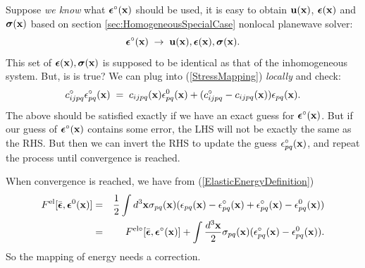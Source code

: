 \documentclass[12pt]{article}
\def\bmath#1{\mbox{\boldmath$#1$}}
\begin{document}
Suppose {\em we know} what $\bmath{\epsilon}^\circ({\bf x})$ should be
used, it is easy to obtain ${\bf u}({\bf x})$, $\bmath{\epsilon}({\bf
x})$ and $\bmath{\sigma}({\bf x})$ based on section
\ref{sec:HomogeneousSpecialCase} nonlocal planewave solver:
\begin{equation}
  \bmath{\epsilon}^\circ({\bf x}) \;\rightarrow\; {\bf u}({\bf
x}),\bmath{\epsilon}({\bf x}),\bmath{\sigma}({\bf x}).
\end{equation}
This set of
$\bmath{\epsilon}({\bf x}),\bmath{\sigma}({\bf x})$ is supposed to be
identical as that of the inhomogeneous system.  But, is is true?  We
can plug into (\ref{StressMapping}) {\em locally} and check:
\begin{equation}
 c^\circ_{ijpq} \epsilon^\circ_{pq}({\bf x}) \;=\; 
 c_{ijpq}({\bf x}) \epsilon^0_{pq}({\bf x}) + 
 (c^\circ_{ijpq} - c_{ijpq}({\bf x})) \epsilon_{pq}({\bf x}).
 \label{RealSpaceInversion}
\end{equation}
The above should be satisfied exactly if we have an exact guess for
$\bmath{\epsilon}^\circ({\bf x})$.  But if our guess of
$\bmath{\epsilon}^\circ({\bf x})$ contains some error, the LHS will
not be exactly the same as the RHS.  But then we can invert the RHS to
update the guess $\epsilon^\circ_{pq}({\bf x})$, and repeat the
process until convergence is reached.

When convergence is reached, we have from (\ref{ElasticEnergyDefinition})
\begin{eqnarray}
 F^{\rm el}[\bar{\bmath{\epsilon}}, \bmath{\epsilon}^0({\bf x})] =&&
 \frac{1}{2}\int d^3{\bf x}  \sigma_{pq}({\bf x})
 ( \epsilon_{pq}({\bf x}) - \epsilon^\circ_{pq}({\bf x}) 
                          + \epsilon^\circ_{pq}({\bf x}) 
                          - \epsilon^0_{pq}({\bf x}) ) \nonumber\\
 =&& F^{\rm el\circ}[\bar{\bmath{\epsilon}}, 
\bmath{\epsilon}^\circ({\bf x})] + 
 \int \frac{d^3{\bf x}}{2} \sigma_{pq}({\bf x}) 
 (\epsilon^\circ_{pq}({\bf x}) - \epsilon^0_{pq}({\bf x})).
   \label{TotalElasticEnergyInhomogeneousSolution}
\end{eqnarray}
So the mapping of energy needs a correction.
\end{document}
